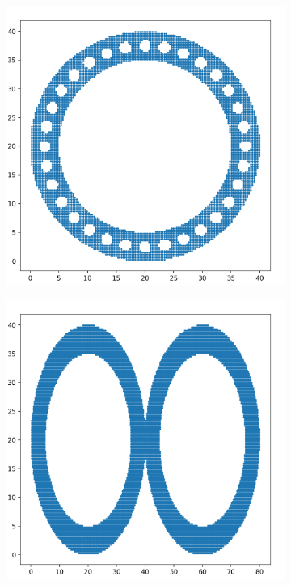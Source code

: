 \documentclass[10pt]{article}
\begin{document}
\begin{figure}[H]
\begin{subfigure}[h]{0.2\textwidth}
        \includegraphics[width=\linewidth]{ms_2}
    \end{subfigure}%
    \begin{subfigure}[h]{0.2\textwidth}
        \includegraphics[width=\linewidth]{ms_3}

\end{subfigure}
\end{figure}
\end{document}
